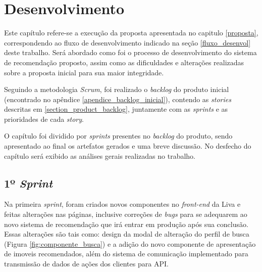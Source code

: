 \chapter{Desenvolvimento}
\label{desenvolvimento}

Este capítulo refere-se a execução da proposta apresentada no capitulo \ref{proposta}, correspondendo ao fluxo de desenvolvimento indicado na seção \ref{fluxo_desenvol} deste trabalho. Será abordado como foi o processo de desenvolvimento do sistema de recomendação proposto, assim como as dificuldades e alterações realizadas sobre a proposta inicial para sua maior integridade.

Seguindo a metodologia \textit{Scrum}, foi realizado o \textit{backlog} do produto inicial (encontrado no apêndice \ref{apendice_backlog_inicial}), contendo as \textit{stories} descritas em \ref{section_product_backlog}, juntamente com as \textit{sprints} e as prioridades de cada \textit{story}.

O capítulo foi dividido por \textit{sprints} presentes no \textit{backlog} do produto, sendo apresentado ao final os artefatos gerados e uma breve discussão. No desfecho do capítulo será exibido as análises gerais realizadas no trabalho.

\section{1º \textit{Sprint}}

Na primeira \textit{sprint}, foram criados novos componentes no \textit{front-end} da Liva e feitas alterações nas páginas, inclusive correções de \textit{bugs} para se adequarem ao novo sistema de recomendação que irá entrar em produção após sua conclusão. Essas alterações são tais como: design da modal de alteração do perfil de busca (Figura \ref{fig:componente_busca}) e a adição do novo componente de apresentação de imoveis recomendados, além do sistema de comunicação implementado para transmissão de dados de ações dos clientes para API.

